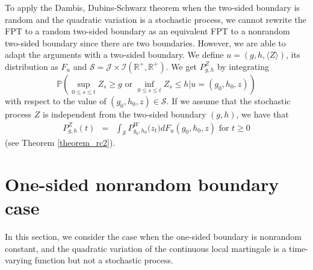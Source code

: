 \documentclass[aop]{imsart}
\theoremstyle{plain}
\theoremstyle{remark}
\newcommand{\reels}{\mathbb{R}}
\newcommand{\proba}{\mathbb{P}}
\begin{document}
To apply the Dambis, Dubins-Schwarz theorem when the two-sided boundary is random and the quadratic variation is a stochastic process, we cannot rewrite the FPT to a random two-sided boundary as an equivalent FPT to a nonrandom two-sided boundary since there are two boundaries. However, we are able to adapt the arguments with a two-sided boundary. We define $u=(g,h,\langle Z\rangle)$, its distribution as $F_{u}$ and $\mathcal{S} = \mathcal{J} \times \mathcal{I}(\reels^+,\reels^+)$. We get $P_{g,h}^Z$ by integrating 
$$\proba (\sup_{0 \leq s \leq t} Z_s   \geq g \text{ or } \inf_{0 \leq s \leq t} Z_s  \leq h | u=(g_0,h_0,z))$$ with respect to the value of $(g_0,h_0,z) \in \mathcal{S}$.
If we assume that the stochastic process $Z$ is independent from the two-sided boundary $(g,h)$, we have that
\begin{eqnarray}
\label{eq_theorem_rc2}
P_{g,h}^Z (t) & = & \int_{\mathcal{S}} P_{g_0,h_0}^W \big(z_t\big) dF_{u}(g_0,h_0,z)\text{ for } t \geq 0
\end{eqnarray}
(see Theorem \ref{theorem_rc2}).

\section{One-sided nonrandom boundary case}
In this section, we consider the case when the one-sided boundary is nonrandom constant, and the quadratic variation of the continuous local martingale is a time-varying function but not a stochastic process. 
\end{document}
